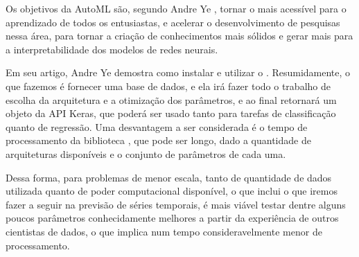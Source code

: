 Os objetivos da AutoML são, segundo Andre Ye \citep{automl}, tornar o  mais acessível para o aprendizado de todos os entusiastas, e acelerar o desenvolvimento de pesquisas nessa área, para tornar a criação de conhecimentos mais sólidos e gerar mais  para a interpretabilidade dos modelos de redes neurais.

Em seu artigo, Andre Ye \citep{automl} demostra como instalar e utilizar o . Resumidamente, o que fazemos é fornecer uma base de dados, e ela irá fazer todo o trabalho de escolha da arquitetura e a otimização dos parâmetros, e ao final retornará um objeto da API Keras, que poderá ser usado tanto para tarefas de classificação quanto de regressão. Uma desvantagem a ser considerada é o tempo de processamento da biblioteca , que pode ser longo, dado a quantidade de arquiteturas disponíveis e o conjunto de parâmetros de cada uma. 

Dessa forma, para problemas de menor escala, tanto de quantidade de dados utilizada quanto de poder computacional disponível, o que inclui o que iremos fazer a seguir na previsão de séries temporais, é mais viável testar dentre alguns poucos parâmetros conhecidamente melhores a partir da experiência de outros cientistas de dados, o que implica num tempo consideravelmente menor de processamento.
